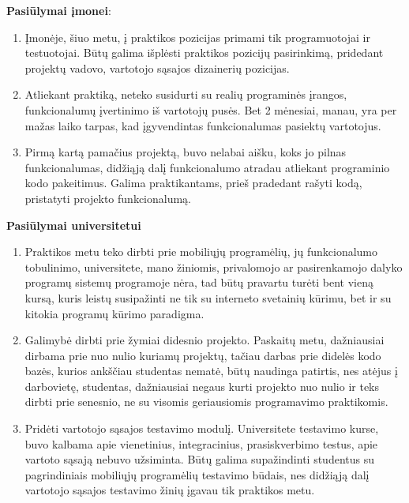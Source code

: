 \documentclass{VUMIFPSPraktika}
\begin{document}
\textbf{Pasiūlymai įmonei}:
\begin{enumerate}
    \item Įmonėje, šiuo metu, į praktikos pozicijas primami tik programuotojai ir testuotojai. Būtų galima išplėsti praktikos pozicijų pasirinkimą, pridedant projektų vadovo, vartotojo sąsajos dizainerių pozicijas.
    \item Atliekant praktiką, neteko susidurti su realių programinės įrangos, funkcionalumų įvertinimo iš vartotojų pusės. Bet 2 mėnesiai, manau, yra per mažas laiko tarpas, kad įgyvendintas funkcionalumas pasiektų vartotojus.
    \item Pirmą kartą pamačius projektą, buvo nelabai aišku, koks jo pilnas funkcionalumas, didžiąją dalį funkcionalumo atradau atliekant programinio kodo pakeitimus. Galima praktikantams, prieš pradedant rašyti kodą, pristatyti projekto funkcionalumą.
\end{enumerate}


\textbf{Pasiūlymai universitetui}
\begin{enumerate}
    \item Praktikos metu teko dirbti prie mobiliųjų programėlių, jų funkcionalumo tobulinimo, universitete, mano žiniomis, privalomojo ar pasirenkamojo dalyko programų sistemų programoje nėra, tad būtų pravartu turėti bent vieną kursą, kuris leistų susipažinti ne tik su interneto svetainių kūrimu, bet ir su kitokia programų kūrimo paradigma.
    \item Galimybė dirbti prie žymiai didesnio projekto. Paskaitų metu, dažniausiai dirbama prie nuo nulio kuriamų projektų, tačiau darbas prie didelės kodo bazės, kurios ankščiau studentas nematė, būtų naudinga patirtis, nes atėjus į darbovietę, studentas, dažniausiai negaus kurti projekto nuo nulio ir teks dirbti prie senesnio, ne su visomis geriausiomis programavimo praktikomis.
    \item Pridėti vartotojo sąsajos testavimo modulį. Universitete testavimo kurse, buvo kalbama apie vienetinius, integracinius, prasiskverbimo testus, apie vartoto sąsają nebuvo užsiminta. Būtų galima supažindinti studentus su pagrindiniais mobiliųjų programėlių testavimo būdais, nes didžiąją dalį vartotojo sąsajos testavimo žinių įgavau tik praktikos metu. 
\end{enumerate}
\end{document}
